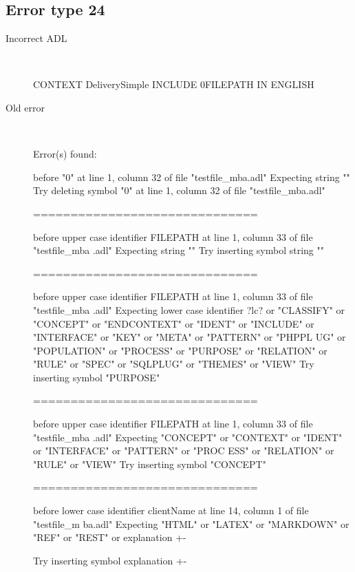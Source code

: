 \hrulefill

\subsection{Error type 24}
  \begin{description}
  \item[Incorrect ADL]~\\
\begin{adl}
CONTEXT DeliverySimple INCLUDE 0FILEPATH IN ENGLISH\end{adl}
  \item[Old error]~\\
\begin{haskell}
Error(s) found:

before "0" at line 1, column 32 of file "testfile_mba.adl"
Expecting string ""
Try deleting symbol "0" at line 1, column 32 of file "testfile_mba.adl"

==============================

before upper case identifier FILEPATH at line 1, column 33 of file "testfile_mba
.adl"
Expecting string ""
Try inserting symbol string ""

==============================

before upper case identifier FILEPATH at line 1, column 33 of file "testfile_mba
.adl"
Expecting lower case identifier ?lc? or "CLASSIFY" or "CONCEPT" or "ENDCONTEXT"
or "IDENT" or "INCLUDE" or "INTERFACE" or "KEY" or "META" or "PATTERN" or "PHPPL
UG" or "POPULATION" or "PROCESS" or "PURPOSE" or "RELATION" or "RULE" or "SPEC"
or "SQLPLUG" or "THEMES" or "VIEW"
Try inserting symbol "PURPOSE"

==============================

before upper case identifier FILEPATH at line 1, column 33 of file "testfile_mba
.adl"
Expecting "CONCEPT" or "CONTEXT" or "IDENT" or "INTERFACE" or "PATTERN" or "PROC
ESS" or "RELATION" or "RULE" or "VIEW"
Try inserting symbol "CONCEPT"

==============================

before lower case identifier clientName at line 14, column 1 of file "testfile_m
ba.adl"
Expecting "HTML" or "LATEX" or "MARKDOWN" or "REF" or "REST" or explanation {+-}

Try inserting symbol explanation {+-}


\end{haskell}
\end{description}
